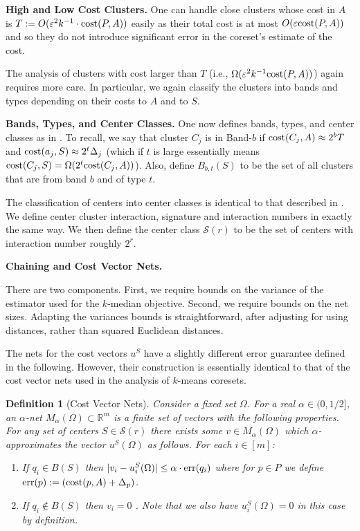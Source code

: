 \documentclass[11pt]{article}
\newtheorem{definition}[lemma]{Definition}
\theoremstyle{restate}
\theoremstyle{definition}
\newcommand{\eps}{\ensuremath{\varepsilon}}
\newcommand{\cost}{\textnormal{cost}}
\newcommand{\err}{\textnormal{err}}
\begin{document}
\noindent \textbf{High and Low Cost Clusters.} One can handle close clusters whose cost in $A$ is $T := O(\eps^2 k^{-1}\cdot \cost(P,A))$ easily as their total cost is at most $O(\eps \cost(P,A))$ and so they do not introduce significant error in the coreset's estimate of the cost.

The analysis of clusters with cost larger than $T$ (i.e., $\Omega(\eps^2 k^{-1} \cost(P,A))$) again requires more care. In particular, we again classify the clusters into bands and types depending on their costs to $A$ and to $S$. 

\noindent \textbf{Bands, Types, and Center Classes.} 
One now defines bands, types, and center classes as in . To recall, we say that cluster $C_j$ is in Band-$b$ if $\cost(C_j,A) \approx 2^b T$ and $\cost(a_j,S) \approx 2^t \Delta_j$ (which if $t$  is large essentially means $\cost(C_j,S) = \Omega(2^t \cost(C_j,A))$). Also, define $B_{b,t}(S)$ to be the set of all clusters that are from band $b$ and of type $t$.

The classification of centers into center classes is identical to that described in . We define center cluster interaction, signature and interaction numbers in exactly the same way. We then define the center class $\mathcal{S}(r)$ to be the set of centers with interaction number roughly $2^r$.  



\noindent\textbf{Chaining and Cost Vector Nets.}

There are two components. First, we require bounds on the variance of the estimator used for the $k$-median objective. Second, we require bounds on the net sizes.
Adapting the variances bounds is straightforward, after adjusting for using distances, rather than squared Euclidean distances.

The nets for the cost vectors $u^S$ have a slightly different error guarantee defined in the following. However, their construction is essentially identical to that of the cost vector nets used in the analysis of $k$-means coresets.

\begin{definition}[Cost Vector Nets]  Consider a fixed set $\Omega$. For a real $\alpha \in (0,1/2]$, an $\alpha$-net  $M_\alpha(\Omega) \subset \mathbb R^m$ is a finite set of vectors with the following properties. For any set of centers $S \in \mathcal{S}(r)$ there exists some $v \in M_\alpha(\Omega)$ which $\alpha$-approximates the vector $u^S(\Omega)$ as follows. For each $i \in [m]$:
\begin{enumerate}
    \item If $q_i \in  B(S)$ then $|v_i - u^S_i(\Omega)|  \leq \alpha \cdot \err(q_i)$ where  for $p \in P$  we define
        $\err(p) :=  (\cost(p,A) + \Delta_{p})$.
    \item If $q_i \notin B(S)$ then $v_i = 0$ . Note that we also have $u^S_i(\Omega) = 0$ in this case by definition.
\end{enumerate}
\end{definition}
\end{document}
